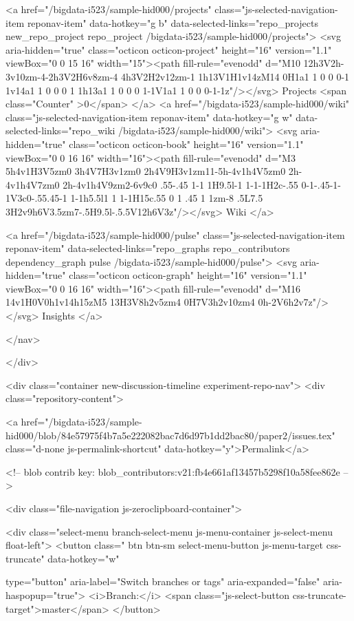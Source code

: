     <a href="/bigdata-i523/sample-hid000/projects" class="js-selected-navigation-item reponav-item" data-hotkey="g b" data-selected-links="repo_projects new_repo_project repo_project /bigdata-i523/sample-hid000/projects">
      <svg aria-hidden="true" class="octicon octicon-project" height="16" version="1.1" viewBox="0 0 15 16" width="15"><path fill-rule="evenodd" d="M10 12h3V2h-3v10zm-4-2h3V2H6v8zm-4 4h3V2H2v12zm-1 1h13V1H1v14zM14 0H1a1 1 0 0 0-1 1v14a1 1 0 0 0 1 1h13a1 1 0 0 0 1-1V1a1 1 0 0 0-1-1z"/></svg>
      Projects
      <span class="Counter" >0</span>
</a>
    <a href="/bigdata-i523/sample-hid000/wiki" class="js-selected-navigation-item reponav-item" data-hotkey="g w" data-selected-links="repo_wiki /bigdata-i523/sample-hid000/wiki">
      <svg aria-hidden="true" class="octicon octicon-book" height="16" version="1.1" viewBox="0 0 16 16" width="16"><path fill-rule="evenodd" d="M3 5h4v1H3V5zm0 3h4V7H3v1zm0 2h4V9H3v1zm11-5h-4v1h4V5zm0 2h-4v1h4V7zm0 2h-4v1h4V9zm2-6v9c0 .55-.45 1-1 1H9.5l-1 1-1-1H2c-.55 0-1-.45-1-1V3c0-.55.45-1 1-1h5.5l1 1 1-1H15c.55 0 1 .45 1 1zm-8 .5L7.5 3H2v9h6V3.5zm7-.5H9.5l-.5.5V12h6V3z"/></svg>
      Wiki
</a>

  <a href="/bigdata-i523/sample-hid000/pulse" class="js-selected-navigation-item reponav-item" data-selected-links="repo_graphs repo_contributors dependency_graph pulse /bigdata-i523/sample-hid000/pulse">
    <svg aria-hidden="true" class="octicon octicon-graph" height="16" version="1.1" viewBox="0 0 16 16" width="16"><path fill-rule="evenodd" d="M16 14v1H0V0h1v14h15zM5 13H3V8h2v5zm4 0H7V3h2v10zm4 0h-2V6h2v7z"/></svg>
    Insights
</a>

</nav>


    </div>

<div class="container new-discussion-timeline experiment-repo-nav">
  <div class="repository-content">

    
  <a href="/bigdata-i523/sample-hid000/blob/84e57975f4b7a5e222082bac7d6d97b1dd2bac80/paper2/issues.tex" class="d-none js-permalink-shortcut" data-hotkey="y">Permalink</a>

  <!-- blob contrib key: blob_contributors:v21:fb4e661af13457b5298f10a58fee862e -->

  <div class="file-navigation js-zeroclipboard-container">
    
<div class="select-menu branch-select-menu js-menu-container js-select-menu float-left">
  <button class=" btn btn-sm select-menu-button js-menu-target css-truncate" data-hotkey="w"
    
    type="button" aria-label="Switch branches or tags" aria-expanded="false" aria-haspopup="true">
      <i>Branch:</i>
      <span class="js-select-button css-truncate-target">master</span>
  </button>

